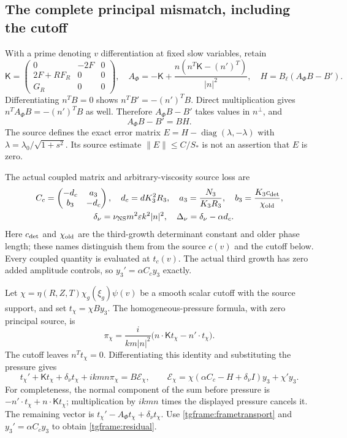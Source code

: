 \subsection{The complete principal mismatch, including the cutoff}

With a prime denoting $v$ differentiation at fixed slow variables,
retain
\[
 \mathsf K=\begin{pmatrix}0&-2F&0\\2F+RF_R&0&0\\G_R&0&0\end{pmatrix},
 \quad
 A_\Phi=-\mathsf K+
        \frac{n(n^T\mathsf K-(n')^T)}{|n|^2},
 \quad H=B_\ell(A_\Phi B-B').
\]
Differentiating $n^TB=0$ shows
$n^TB'=-(n')^TB$. Direct multiplication gives
$n^TA_\Phi B=-(n')^TB$ as well. Therefore
$A_\Phi B-B'$ takes values in $n^\perp$, and
\begin{equation}\label{tgframe:frametransport}
 A_\Phi B-B'=BH.
\end{equation}
The source defines the exact error matrix
$E=H-\operatorname{diag}(\lambda,-\lambda)$ with
$\lambda=\lambda_0/\sqrt{1+s^2}$. Its source estimate
$\|E\|\le C/S_*$ is not an assertion that $E$ is zero.

The actual coupled matrix and arbitrary-viscosity source loss are
\[
\begin{gathered}
 C_c=\begin{pmatrix}-d_c&a_3\\b_3&-d_c\end{pmatrix},
 \quad d_c=dK_3^2R_3,\quad
 a_3=\frac{N_3}{K_3R_3},\quad b_3=\frac{K_3c_{\rm det}}{\chi_{\rm old}},\\
 \quad
 \delta_\nu=\nu_{\rm NS}m^2\varepsilon k^2|n|^2,\quad
 \Delta_\nu=\delta_\nu-\alpha d_c.
\end{gathered}
\]
Here $c_{\rm det}$ and $\chi_{\rm old}$ are the third-growth determinant
constant and older phase length; these names distinguish them from the
source $c(v)$ and the cutoff below. Every coupled quantity is evaluated
at $t_c(v)$. The actual third growth has zero added amplitude controls,
so $y_3'=\alpha C_cy_3$ exactly.

Let $\chi=\eta(R,Z,T)\chi_g(\xi_g)\psi(v)$ be a smooth scalar
cutoff with the source support, and set $t_\chi=\chi By_3$.
The homogeneous-pressure formula, with zero principal source, is
\[
 \pi_\chi=\frac{i}{km|n|^2}
        \bigl(n\cdot\mathsf Kt_\chi-n'\cdot t_\chi\bigr).
\]
The cutoff leaves $n^Tt_\chi=0$. Differentiating this identity
and substituting the pressure gives
\begin{equation}\label{tgframe:residual}
 t_\chi'+\mathsf Kt_\chi+\delta_\nu t_\chi+ikmn\pi_\chi
 =B\mathcal E_\chi,\qquad
 \mathcal E_\chi=\chi(\alpha C_c-H+\delta_\nu I)y_3+\chi'y_3.
\end{equation}
For completeness, the normal component of the sum before pressure is
$-n'\cdot t_\chi+n\cdot\mathsf Kt_\chi$; multiplication by $ikmn$
times the displayed pressure cancels it. The remaining vector is
$t_\chi'-A_\Phi t_\chi+\delta_\nu t_\chi$. Use
\eqref{tgframe:frametransport} and $y_3'=\alpha C_cy_3$ to obtain
\eqref{tgframe:residual}.

